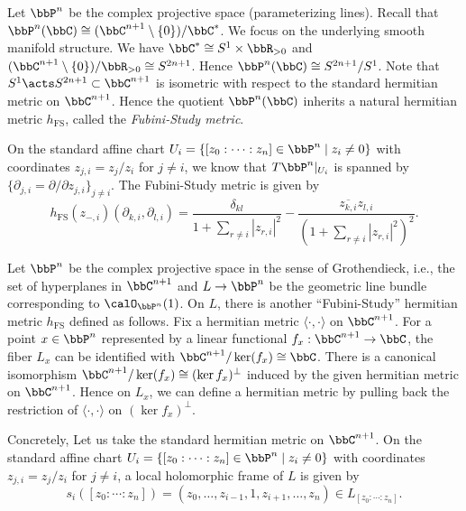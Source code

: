 \begin{example}\label{eg:Fubini-Study_metric_on_P^n}
	Let \(\bbP^n\) be the complex projective space (parameterizing lines).
	Recall that \(\bbP^n(\bbC) \cong (\bbC^{n+1} \setminus \{0\})/\bbC^*\).
	We focus on the underlying smooth manifold structure.
	We have \(\bbC^* \cong S^1 \times \bbR_{>0}\) and \((\bbC^{n+1} \setminus \{0\})/ \bbR_{>0} \cong S^{2n+1}\).
	Hence \(\bbP^n(\bbC) \cong S^{2n+1}/S^1\).
	Note that \(S^1 \acts S^{2n+1} \subset \bbC^{n+1}\) is isometric with respect to the standard hermitian metric on \(\bbC^{n+1}\).
	Hence the quotient \(\bbP^n(\bbC)\) inherits a natural hermitian metric \(h_{\text{FS}}\), called the \emph{Fubini-Study metric}.

	On the standard affine chart \(U_i = \{[z_0: \cdots : z_n] \in \bbP^n \mid z_i \neq 0\}\) with coordinates \(z_{j,i} = z_j/z_i\) for \(j \neq i\),
	we know that \(T\bbP^n|_{U_i}\) is spanned by \(\{\partial_{j,i} = \partial/\partial z_{j,i}\}_{j \neq i}\).
	The Fubini-Study metric is given by
	\[h_{\text{FS}}(z_{-,i})(\partial_{k,i}, \partial_{l,i}) = \frac{\delta_{kl}}{1 + \sum_{r \neq i} |z_{r,i}|^2} - \frac{\overline{z_{k,i}} z_{l,i}}{(1 + \sum_{r \neq i} |z_{r,i}|^2)^2}.\]
\end{example}

\begin{example}\label{eg:Fubini-Study_metric_on_O_1}
	Let \(\bbP^n\) be the complex projective space in the sense of Grothendieck, i.e., the set of hyperplanes in \(\bbC^{n+1}\) and \(L \to \bbP^n\) be the geometric line bundle corresponding to \(\calO_{\bbP^n}(1)\).
	On \(L\), there is another ``Fubini-Study'' hermitian metric \(h_{\text{FS}}\) defined as follows.
	Fix a hermitian metric \(\langle \cdot, \cdot \rangle\) on \(\bbC^{n+1}\).
	For a point \(x \in \bbP^n\) represented by a linear functional \(f_x: \bbC^{n+1} \to \bbC\), the fiber \(L_x\) can be identified with \(\bbC^{n+1}/\ker(f_x) \cong \bbC\).
	There is a canonical isomorphism \(\bbC^{n+1}/\ker(f_x) \cong (\ker f_x)^\perp\) induced by the given hermitian metric on \(\bbC^{n+1}\).
	Hence on \(L_x\), we can define a hermitian metric by pulling back the restriction of \(\langle \cdot, \cdot \rangle\) on \((\ker f_x)^\perp\).

	Concretely, Let us take the standard hermitian metric on \(\bbC^{n+1}\).
	On the standard affine chart \(U_i = \{[z_0: \cdots : z_n] \in \bbP^n \mid z_i \neq 0\}\) with coordinates \(z_{j,i} = z_j/z_i\) for \(j \neq i\),
	a local holomorphic frame of \(L\) is given by
	\[s_i([z_0: \cdots : z_n]) = (z_0, \ldots, z_{i-1}, 1, z_{i+1}, \ldots, z_n) \in L_{[z_0: \cdots : z_n]}.\]

\end{example}

